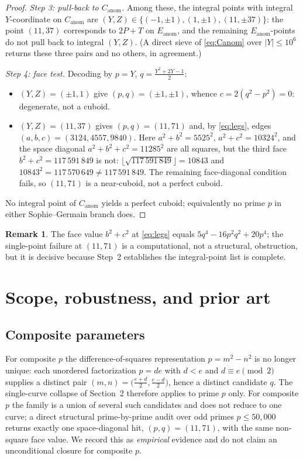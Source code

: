 \documentclass[11pt,reqno]{amsart}
\theoremstyle{plain}
\theoremstyle{definition}
\newtheorem{remark}{Remark}
\newcommand{\Eanom}{E_{\mathrm{anom}}}
\newcommand{\Canom}{C_{\mathrm{anom}}}
\begin{document}
\begin{proof}
\emph{Step 3: pull-back to $\Canom$.} Among these, the integral points with integral
$Y$-coordinate on $\Canom$ are $(Y,Z)\in\{(-1,\pm1),(1,\pm1),(11,\pm37)\}$: the point
$(11,37)$ corresponds to $2P+T$ on $\Eanom$, and the remaining $\Eanom$-points do not
pull back to integral $(Y,Z)$. (A direct sieve of \eqref{eq:Canom} over $|Y|\le 10^{6}$
returns these three pairs and no others, in agreement.)

\emph{Step 4: face test.} Decoding by $p=Y$, $q=\tfrac{Y^{2}+2Y-1}{2}$:
\begin{itemize}
\item $(Y,Z)=(\pm1,1)$ give $(p,q)=(\pm1,\pm1)$, whence $c=2(q^{2}-p^{2})=0$: degenerate,
not a cuboid.
\item $(Y,Z)=(11,37)$ gives $(p,q)=(11,71)$ and, by \eqref{eq:legs}, edges
$(a,b,c)=(3124,4557,9840)$. Here $a^{2}+b^{2}=5525^{2}$, $a^{2}+c^{2}=10324^{2}$, and the
space diagonal $a^{2}+b^{2}+c^{2}=11285^{2}$ are all squares, but the third face
$b^{2}+c^{2}=117\,591\,849$ is not: $\lfloor\sqrt{117\,591\,849}\rfloor=10843$ and
$10843^{2}=117\,570\,649\neq 117\,591\,849$. The remaining face-diagonal condition fails,
so $(11,71)$ is a near-cuboid, not a perfect cuboid.
\end{itemize}
No integral point of $\Canom$ yields a perfect cuboid; equivalently no prime $p$ in
either Sophie--Germain branch does.
\end{proof}

\begin{remark}
The face value $b^{2}+c^{2}$ at \eqref{eq:legs} equals $5q^{4}-16p^{2}q^{2}+20p^{4}$; the
single-point failure at $(11,71)$ is a computational, not a structural, obstruction, but
it is decisive because Step~2 establishes the integral-point list is complete.
\end{remark}

\section{Scope, robustness, and prior art}

\subsection{Composite parameters}
For composite $p$ the difference-of-squares representation $p=m^{2}-n^{2}$ is no longer
unique: each unordered factorization $p=de$ with $d<e$ and $d\equiv e\pmod 2$ supplies a
distinct pair $(m,n)=\bigl(\tfrac{e+d}{2},\tfrac{e-d}{2}\bigr)$, hence a distinct
candidate $q$. The single-curve collapse of Section~2 therefore applies to prime $p$
only. For composite $p$ the family is a union of several such candidates and does not
reduce to one curve; a direct structural prime-by-prime audit over odd primes
$p\le 50{,}000$ returns exactly one space-diagonal hit, $(p,q)=(11,71)$, with the same
non-square face value. We record this as \emph{empirical} evidence and do not claim an
unconditional closure for composite $p$.
\end{document}
